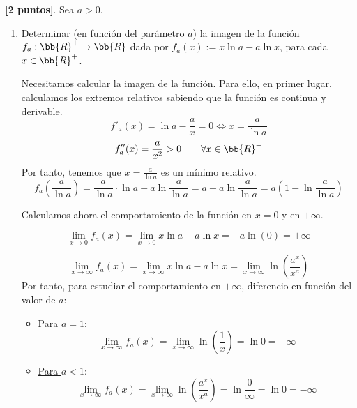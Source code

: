 \documentclass[12pt]{article}
\begin{document}
\begin{ejercicio} \textbf{[2 puntos]}. Sea $a>0$.
\begin{enumerate}
    \item Determinar (en función del parámetro $a$) la imagen de la función $f_a:\bb{R}^+\to \bb{R}$ dada por $f_a(x):=x\ln a - a\ln x$, para cada $x\in \bb{R}^+$.

    Necesitamos calcular la imagen de la función. Para ello, en primer lugar, calculamos los extremos relativos sabiendo que la función es continua y derivable.
    \begin{equation*}
        f'_a(x) = \ln a -\frac{a}{x} = 0 \Longleftrightarrow x=\frac{a}{\ln a}
    \end{equation*}
    \begin{equation*}
        f''_a(x) = \frac{a}{x^2} >0 \qquad \forall x\in \bb{R}^+
    \end{equation*}
    Por tanto, tenemos que $x=\frac{a}{\ln a}$ es un mínimo relativo.
    \begin{equation*}
        f_a\left(\frac{a}{\ln a}\right) = \frac{a}{\ln a} \cdot \ln a - a\ln \frac{a}{\ln a} = a-a\ln \frac{a}{\ln a} =a\left(1-\ln \frac{a}{\ln a}\right)
    \end{equation*}
    
    Calculamos ahora el comportamiento de la función en $x=0$ y en $+\infty$.

    \begin{equation*}
        \lim_{x\to 0} f_a(x) = \lim_{x\to 0} x\ln a - a\ln x = -a\ln(0) = +\infty
    \end{equation*}
    
    \begin{equation*}
        \lim_{x\to \infty} f_a(x) = \lim_{x\to \infty} x\ln a - a\ln x 
        = \lim_{x\to \infty} \ln \left(\frac{a^x}{x^a}\right)
    \end{equation*}
    Por tanto, para estudiar el comportamiento en $+\infty$, diferencio en función del valor de $a$:
    \begin{itemize}
        \item \underline{Para $a=1$}:
        \begin{equation*}
            \lim_{x\to \infty} f_a(x) 
            = \lim_{x\to \infty} \ln \left(\frac{1}{x}\right) = \ln 0 = -\infty
        \end{equation*}

        \item \underline{Para $a<1$}:
        \begin{equation*}
            \lim_{x\to \infty} f_a(x) 
            = \lim_{x\to \infty} \ln \left(\frac{a^x}{x^a}\right) =\ln \frac{0}{\infty} = \ln 0 = -\infty
        \end{equation*}


\end{itemize}
\end{enumerate}
\end{ejercicio}
\end{document}
